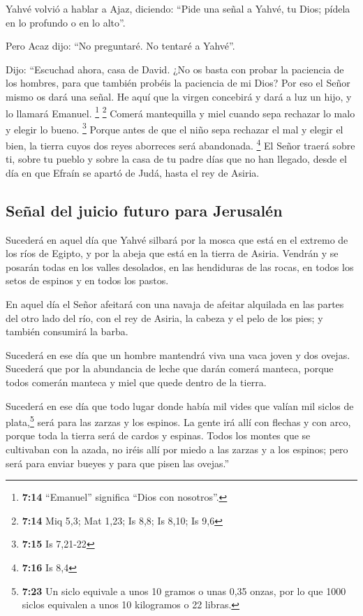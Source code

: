  Yahvé volvió a hablar a Ajaz, diciendo: 
``Pide una señal a Yahvé, tu Dios; pídela en lo profundo o en lo alto''.

 Pero Acaz dijo: ``No preguntaré. No tentaré a Yahvé''.

 Dijo: ``Escuchad ahora, casa de David. ¿No os basta con
probar la paciencia de los hombres, para que también probéis la
paciencia de mi Dios?  Por eso el Señor mismo os dará una
señal. He aquí que la virgen concebirá y dará a luz un hijo, y lo
llamará Emanuel. \footnote{\textbf{7:14} ``Emanuel'' significa ``Dios
  con nosotros''.} \footnote{\textbf{7:14} Miq 5,3; Mat 1,23; Is 8,8; Is
  8,10; Is 9,6}  Comerá mantequilla y miel cuando sepa
rechazar lo malo y elegir lo bueno. \footnote{\textbf{7:15} Is 7,21-22}
 Porque antes de que el niño sepa rechazar el mal y
elegir el bien, la tierra cuyos dos reyes aborreces será abandonada.
\footnote{\textbf{7:16} Is 8,4}  El Señor traerá sobre
ti, sobre tu pueblo y sobre la casa de tu padre días que no han llegado,
desde el día en que Efraín se apartó de Judá, hasta el rey de Asiria.

\hypertarget{seuxf1al-del-juicio-futuro-para-jerusaluxe9n}{%
\subsection{Señal del juicio futuro para
Jerusalén}\label{seuxf1al-del-juicio-futuro-para-jerusaluxe9n}}

 Sucederá en aquel día que Yahvé silbará por la mosca que
está en el extremo de los ríos de Egipto, y por la abeja que está en la
tierra de Asiria.  Vendrán y se posarán todas en los
valles desolados, en las hendiduras de las rocas, en todos los setos de
espinos y en todos los pastos.

 En aquel día el Señor afeitará con una navaja de afeitar
alquilada en las partes del otro lado del río, con el rey de Asiria, la
cabeza y el pelo de los pies; y también consumirá la barba.

 Sucederá en ese día que un hombre mantendrá viva una
vaca joven y dos ovejas.  Sucederá que por la abundancia
de leche que darán comerá manteca, porque todos comerán manteca y miel
que quede dentro de la tierra.

 Sucederá en ese día que todo lugar donde había mil vides
que valían mil siclos de plata,\footnote{\textbf{7:23} Un siclo equivale
  a unos 10 gramos o unas 0,35 onzas, por lo que 1000 siclos equivalen a
  unos 10 kilogramos o 22 libras.} será para las zarzas y los espinos.
 La gente irá allí con flechas y con arco, porque toda la
tierra será de cardos y espinas.  Todos los montes que se
cultivaban con la azada, no iréis allí por miedo a las zarzas y a los
espinos; pero será para enviar bueyes y para que pisen las ovejas.''

